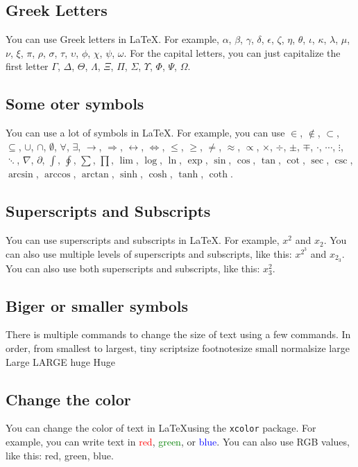 \documentclass{article}
\begin{document}
\subsection{Greek Letters}
You can use Greek letters in \LaTeX. For example, $\alpha$, $\beta$, $\gamma$, $\delta$, $\epsilon$, $\zeta$, $\eta$, $\theta$, $\iota$, $\kappa$, $\lambda$, $\mu$, $\nu$, $\xi$, $\pi$, $\rho$, $\sigma$, $\tau$, $\upsilon$, $\phi$, $\chi$, $\psi$, $\omega$. For the capital letters, you can just capitalize the first letter $\Gamma$, $\Delta$, $\Theta$, $\Lambda$, $\Xi$, $\Pi$, $\Sigma$, $\Upsilon$, $\Phi$, $\Psi$, $\Omega$.

\subsection{Some oter symbols}
You can use a lot of symbols in \LaTeX. For example, you can use $\in$, $\notin$, $\subset$, $\subseteq$, $\cup$, $\cap$, $\emptyset$, $\forall$, $\exists$, $\rightarrow$, $\Rightarrow$, $\leftrightarrow$, $\Leftrightarrow$, $\leq$, $\geq$, $\neq$, $\approx$, $\propto$, $\times$, $\div$, $\pm$, $\mp$, $\cdot$, $\cdots$, $\vdots$, $\ddots$, $\nabla$, $\partial$, $\int$, $\oint$, $\sum$, $\prod$, $\lim$, $\log$, $\ln$, $\exp$, $\sin$, $\cos$, $\tan$, $\cot$, $\sec$, $\csc$, $\arcsin$, $\arccos$, $\arctan$, $\sinh$, $\cosh$, $\tanh$, $\coth$.

\subsection{Superscripts and Subscripts}
You can use superscripts and subscripts in \LaTeX. For example, $x^2$ and $x_2$. You can also use multiple levels of superscripts and subscripts, like this: $x^{2^3}$ and $x_{2_3}$. You can also use both superscripts and subscripts, like this: $x^{2}_{3}$.

\subsection{Biger or smaller symbols}
There is multiple commands to change the size of text using a few commands. In order, from smallest to largest, \tiny tiny \scriptsize scriptsize \footnotesize footnotesize \small small \normalsize normalsize \large large \Large Large \LARGE LARGE \huge huge \Huge Huge

\normalsize %

\subsection{Change the color}
You can change the color of text in \LaTeX using the \texttt{xcolor} package. For example, you can write text in \textcolor{red}{red}, \textcolor{green}{green}, or \textcolor{blue}{blue}. You can also use RGB values, like this: \textcolor[RGB]{255,0,0}{red}, \textcolor[RGB]{0,255,0}{green}, \textcolor[RGB]{0,0,255}{blue}.
\end{document}
